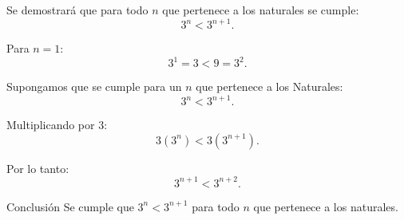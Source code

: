 Se demostrará que para todo $n$ que pertenece a los naturales se cumple:
\[
3^n < 3^{n+1}.
\]

 Para $n=1$:
\[
3^1 = 3 < 9 = 3^2.
\]

Supongamos que se cumple para un $n$ que pertenece a los Naturales:
\[
3^n < 3^{n+1}.
\]

Multiplicando por 3:
\[
3(3^n) < 3(3^{n+1}).
\]

Por lo tanto:
\[
3^{n+1} < 3^{n+2}.
\]

Conclusión
Se cumple que $3^n < 3^{n+1}$ para todo $n$ que pertenece a los naturales.
